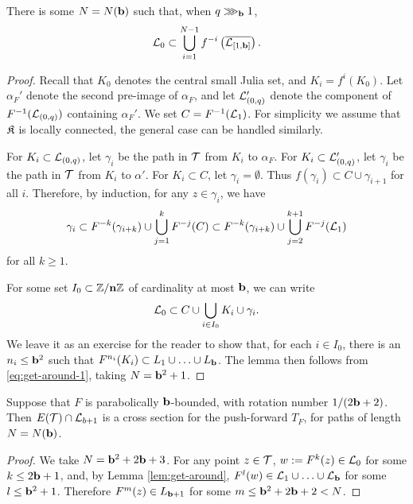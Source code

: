 \begin{lemma} \label{lem:get-around}
There is some $N = N(\mathbf b)$ such that, when $q \ggg_{\mathbf b} 1$,  $$\mathcal L_0 \subset \bigcup_{i=1}^{N-1} f^{-i}\left(\overline{\mathcal L_{[1, \mathbf b]}}\right).$$ 
\end{lemma}
\begin{proof}
Recall that $K_0$ denotes the central small Julia set, and $K_i = f^i(K_0)$.
Let $\alpha_F'$ denote the second pre-image of $\alpha_F$, and let $\mathcal L_{(0, q)}'$ denote the component of $F^{-1}(\mathcal L_{(0, q)})$ containing $\alpha_F'$. We set $C=F^{-1}(\mathcal L_1)$.
For simplicity we assume that $\mathfrak{K}$ is locally connected, the general case can be handled similarly.


For $K_i \subset \mathcal L_{(0, q)}$, let $\gamma_i$ be the path in $\mathcal T$ from $K_i$ to $\alpha_F$.
For $K_i \subset \mathcal L_{(0, q)}'$, let $\gamma_i$ be the path in $\mathcal T$ from $K_i$ to $\alpha'$.
For $K_i\subset C$, let $\gamma_i = \emptyset$. 
Thus $f(\gamma_i) \subset C \cup \gamma_{i+1}$ for all $i$.
Therefore, by induction,
for any $z \in \gamma_i$,
we have 
\begin{equation} \label{eq:get-around-1}
\gamma_i \subset F^{-k}(\gamma_{i+k}) \cup \bigcup_{j=1}^{k} F^{-j}(C)\subset F^{-k}(\gamma_{i+k}) \cup \bigcup_{j=2}^{k+1} F^{-j}(\mathcal L_1)
\end{equation}
for all $k \ge 1$. 

For some set $I_0\subset \mathbb Z/\mathbf{n}\mathbb Z$ of cardinality at most $\mathbf b$, we can write 
$$\mathcal L_0 \subset C\cup \bigcup_{i \in I_0} K_i \cup \gamma_i.$$
We leave it as an exercise for the reader to show that, 
for each $i \in I_0$,
there is an $n_i \le \mathbf b^2$ such that $F^{n_i}(K_i) \subset L_1 \cup \ldots \cup L_{\mathbf b}$.
The lemma then follows from \eqref{eq:get-around-1},  taking $N = \mathbf b^2 + 1$.
\end{proof}

\begin{cor} \label{cor:cross-section}
Suppose that $F$ is parabolically $\mathbf b$-bounded, 
with rotation number $1/(2 \mathbf b + 2)$. 
Then $E(\mathcal T) \cap \mathcal L_{b+1}$ is a cross section for the push-forward $T_F$, for paths of length $N = N(\mathbf b)$. 
\end{cor}
\begin{proof}
We take $N = \mathbf b^2 + 2 \mathbf b + 3$. 
For any point $z \in \mathcal T$, 
$w:=F^k(z) \in \mathcal L_0$ for some $k \le 2 \mathbf b + 1$,
and,
by Lemma \ref{lem:get-around},
$F^l(w) \in \mathcal L_1 \cup \ldots \cup \mathcal L_{\mathbf b}$ for some $l \le \mathbf b^2 + 1$. 
Therefore $F^m(z) \in L_{\mathbf b + 1}$ for some $m \le \mathbf b^2  + 2\mathbf b + 2 < N$. 
\end{proof}

